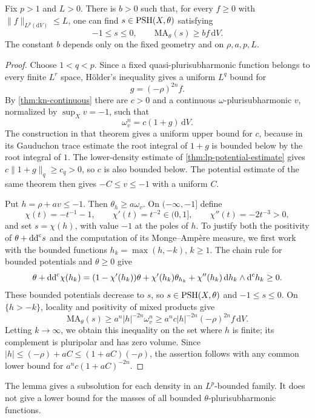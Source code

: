 \begin{lemma}\label{lem:big-lp-subsolution}
Fix $p>1$ and $L>0$. There is $b>0$ such that, for every $f\geq0$ with $\|f\|_{L^p(\mathrm{d}V)}\leq L$, one can find $s\in\mathrm{PSH}(X,\theta)$ satisfying
\[
 -1\leq s\leq0,\qquad \mathrm{MA}_\theta(s)\geq b f\,\mathrm{d}V.
\]
The constant $b$ depends only on the fixed geometry and on $\rho,a,p,L$.
\end{lemma}
\begin{proof}
Choose $1<q<p$. Since a fixed quasi-plurisubharmonic function belongs to every finite $L^r$ space, H\"older's inequality gives a uniform $L^q$ bound for
\[
 g=(-\rho)^{2n}f.
\]
By \cref{thm:kn-continuous} there are $c>0$ and a continuous $\omega$-plurisubharmonic $v$, normalized by $\sup_Xv=-1$, such that
\[
 \omega_v^n=c(1+g)\,\mathrm{d}V.
\]
The construction in that theorem gives a uniform upper bound for $c$, because in its Gauduchon trace estimate the root integral of $1+g$ is bounded below by the root integral of $1$. The lower-density estimate of \cref{thm:lp-potential-estimate} gives $c\|1+g\|_q\geq c_q>0$, so $c$ is also bounded below. The potential estimate of the same theorem then gives $-C\leq v\leq-1$ with a uniform $C$.

Put $h=\rho+av\leq-1$. Then $\theta_h\geq a\omega_v$. On $(-\infty,-1]$ define
\[
 \chi(t)=-t^{-1}-1,\qquad
 \chi'(t)=t^{-2}\in(0,1],\qquad \chi''(t)=-2t^{-3}>0,
\]
and set $s=\chi(h)$, with value $-1$ at the poles of $h$. To justify both the positivity of $\theta+\mathrm{dd}^{\mathrm{c}} s$ and the computation of its Monge--Amp\`ere measure, we first work with the bounded functions $h_k=\max(h,-k)$, $k\geq1$. The chain rule for bounded potentials and $\theta\geq0$ give
\[
 \theta+\mathrm{dd}^{\mathrm{c}}\chi(h_k)
 =(1-\chi'(h_k))\theta+\chi'(h_k)\theta_{h_k}
       +\chi''(h_k)\,\mathrm{d}h_k\wedge \mathrm d^{\mathrm c} h_k\geq0.
\]
These bounded potentials decrease to $s$, so $s\in\mathrm{PSH}(X,\theta)$ and $-1\leq s\leq0$. On $\{h>-k\}$, locality and positivity of mixed products give
\[
 \mathrm{MA}_\theta(s)
 \geq a^n|h|^{-2n}\omega_v^n
 \geq a^nc|h|^{-2n}(-\rho)^{2n}f\,\mathrm{d}V.
\]
Letting $k\to\infty$, we obtain this inequality on the set where $h$ is finite; its complement is pluripolar and has zero volume. Since $|h|\leq(-\rho)+aC\leq(1+aC)(-\rho)$, the assertion follows with any common lower bound for $a^nc(1+aC)^{-2n}$.
\end{proof}

The lemma gives a subsolution for each density in an $L^p$-bounded family. It does not give a lower bound for the masses of all bounded $\theta$-plurisubharmonic functions.

